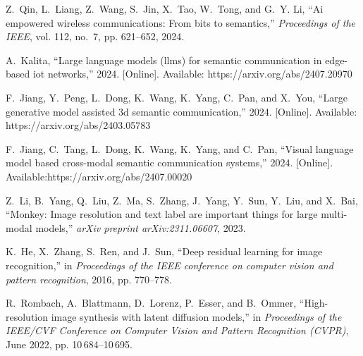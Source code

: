 \documentclass[conference]{IEEEtran}
\begin{document}
\begin{thebibliography}{1}

Z.~Qin, L.~Liang, Z.~Wang, S.~Jin, X.~Tao, W.~Tong, and G.~Y. Li, ``Ai empowered wireless communications: From bits to semantics,'' \emph{Proceedings of the IEEE}, vol. 112, no.~7, pp. 621--652, 2024.

A.~Kalita, ``Large language models (llms) for semantic communication in edge-based iot networks,'' 2024. [Online]. Available: https://arxiv.org/abs/2407.20970


F.~Jiang, Y.~Peng, L.~Dong, K.~Wang, K.~Yang, C.~Pan, and X.~You, ``Large generative model assisted 3d semantic communication,'' 2024. [Online]. Available: https://arxiv.org/abs/2403.05783



F.~Jiang, C.~Tang, L.~Dong, K.~Wang, K.~Yang, and C.~Pan, ``Visual language model based cross-modal semantic communication systems,'' 2024. [Online]. Available:https://arxiv.org/abs/2407.00020


Z.~Li, B.~Yang, Q.~Liu, Z.~Ma, S.~Zhang, J.~Yang, Y.~Sun, Y.~Liu, and X.~Bai, ``Monkey: Image resolution and text label are important things for large multi-modal models,'' \emph{arXiv preprint arXiv:2311.06607}, 2023.



K.~He, X.~Zhang, S.~Ren, and J.~Sun, ``Deep residual learning for image recognition,'' in \emph{Proceedings of the IEEE conference on computer vision and pattern recognition}, 2016, pp. 770--778.

R.~Rombach, A.~Blattmann, D.~Lorenz, P.~Esser, and B.~Ommer, ``High-resolution image synthesis with latent diffusion models,'' in \emph{Proceedings of the IEEE/CVF Conference on Computer Vision and Pattern Recognition (CVPR)}, June 2022, pp. 10\,684--10\,695.

\end{thebibliography}
\end{document}
